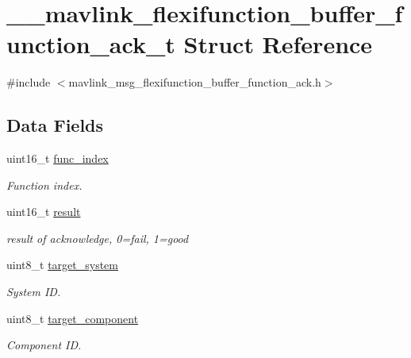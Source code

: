 \hypertarget{struct____mavlink__flexifunction__buffer__function__ack__t}{\section{\+\_\+\+\_\+mavlink\+\_\+flexifunction\+\_\+buffer\+\_\+function\+\_\+ack\+\_\+t Struct Reference}
\label{struct____mavlink__flexifunction__buffer__function__ack__t}
}


{\ttfamily \#include $<$mavlink\+\_\+msg\+\_\+flexifunction\+\_\+buffer\+\_\+function\+\_\+ack.\+h$>$}

\subsection*{Data Fields}
\begin{DoxyCompactItemize}
\item 
uint16\+\_\+t \hyperlink{struct____mavlink__flexifunction__buffer__function__ack__t_a6acb6f4aebfa214ab38fce9c722aa7e0}{func\+\_\+index}
\begin{DoxyCompactList}\small\item\em Function index. \end{DoxyCompactList}\item 
uint16\+\_\+t \hyperlink{struct____mavlink__flexifunction__buffer__function__ack__t_a77230619b791d619da3e22bd4feae4be}{result}
\begin{DoxyCompactList}\small\item\em result of acknowledge, 0=fail, 1=good \end{DoxyCompactList}\item 
uint8\+\_\+t \hyperlink{struct____mavlink__flexifunction__buffer__function__ack__t_a272d1c2992e29ebbc3281bf98ceeb99d}{target\+\_\+system}
\begin{DoxyCompactList}\small\item\em System I\+D. \end{DoxyCompactList}\item 
uint8\+\_\+t \hyperlink{struct____mavlink__flexifunction__buffer__function__ack__t_abf29bf8a8ab1d26afb84d65218e79f5c}{target\+\_\+component}
\begin{DoxyCompactList}\small\item\em Component I\+D. \end{DoxyCompactList}\end{DoxyCompactItemize}


